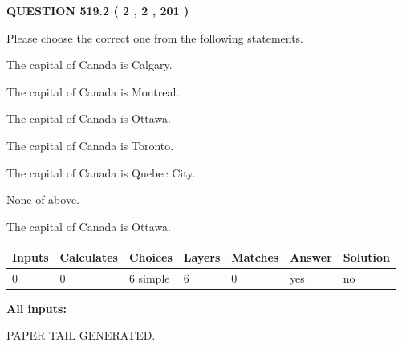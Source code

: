 \documentclass[12pt]{article}
\begin{document}
\vspace{0.2in}
  
{\textbf{\Large{QUESTION
519.2 
 ( 2 , 2 , 201 )
}}}
  
  
Please choose the correct one from the following statements.
 
 
The capital of Canada is Calgary.
 
 
The capital of Canada is Montreal.
 
 
The capital of Canada is Ottawa.
 
 
The capital of Canada is Toronto.
 
 
The capital of Canada is Quebec City.
 
 
 None of above.
 
 
\noindent{}
 
 
The capital of Canada is Ottawa.
 
 
\noindent{}
 
 
   
   
   
   
\noindent\begin{tabular}{|l|l|l|l|l|l|l|}
 \hline
Inputs & Calculates & Choices & Layers & Matches & Answer & Solution \\ \hline
 0  & 
 0  & 
 6
  simple  
  & 
 6  & 
 0  & 
  yes & 
  no 
  \\ \hline
 \end{tabular}
   
   
   
   
\noindent{}
   
   
   
   
\noindent\vspace{0.1in}\hspace{-0.08in} {\textbf{\Large{All inputs: }}}
   
   
   
   
   
   
 \vspace{0.2in}
 
   
   
\vspace{2.0in} PAPER TAIL GENERATED.
   
\end{document}
